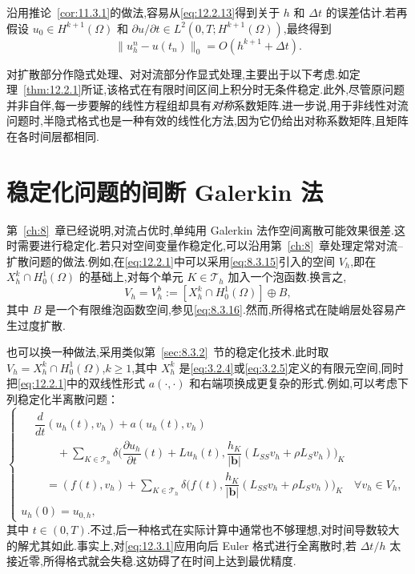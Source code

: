 沿用推论~\ref{cor:11.3.1}的做法,容易从\eqref{eq:12.2.13}得到关于 \(h\) 和 \(\Delta t\) 的误差估计.若再假设 \(u_0\in H^{k+1}(\Omega)\) 和 \(\partial u/\partial t\in L^2(0,T;H^{k+1}(\Omega))\),最终得到
\[
  \|u_h^n-u(t_n)\|_0=O(h^{k+1}+\Delta t).
\]

对扩散部分作隐式处理、对对流部分作显式处理,主要出于以下考虑.如定理~\ref{thm:12.2.1}所证,该格式在有限时间区间上积分时无条件稳定.此外,尽管原问题并非自伴,每一步要解的线性方程组却具有\emph{对称}系数矩阵.进一步说,用于非线性对流问题时,半隐式格式也是一种有效的线性化方法,因为它仍给出对称系数矩阵,且矩阵在各时间层都相同.

\section{稳定化问题的间断 Galerkin 法}\label{sec:12.3}

第~\ref{ch:8}~章已经说明,对流占优时,单纯用 Galerkin 法作空间离散可能效果很差.这时需要进行稳定化.若只对空间变量作稳定化,可以沿用第~\ref{ch:8}~章处理定常对流--扩散问题的做法.例如,在\eqref{eq:12.2.1}中可以采用\eqref{eq:8.3.15}引入的空间 \(V_h\),即在 \(X_h^k\cap H_0^1(\Omega)\) 的基础上,对每个单元 \(K\in\mathcal T_h\) 加入一个泡函数.换言之,
\[
  V_h=V_h^b:=[X_h^k\cap H_0^1(\Omega)]\oplus B,
\]
其中 \(B\) 是一个有限维泡函数空间,参见\eqref{eq:8.3.16}.然而,所得格式在陡峭层处容易产生过度扩散.

也可以换一种做法,采用类似第~\ref{sec:8.3.2}~节的稳定化技术.此时取 \(V_h=X_h^k\cap H_0^1(\Omega)\),\(k\ge1\),其中 \(X_h^k\) 是\eqref{eq:3.2.4}或\eqref{eq:3.2.5}定义的有限元空间,同时把\eqref{eq:12.2.1}中的双线性形式 \(a(\cdot,\cdot)\) 和右端项换成更复杂的形式.例如,可以考虑下列稳定化半离散问题：
\begin{equation}\label{eq:12.3.1}
  \begin{cases}
    \begin{aligned}
      &\dfrac{d}{dt}(u_h(t),v_h)+a(u_h(t),v_h)\\
      &\qquad+\displaystyle\sum_{K\in\mathcal T_h}\delta\biggl(
          \dfrac{\partial u_h}{\partial t}(t)+Lu_h(t),
          \dfrac{h_K}{|\boldsymbol{b}|}(L_{SS}v_h+\rho L_Sv_h)\biggr)_K\\
      &\quad=(f(t),v_h)
        +\displaystyle\sum_{K\in\mathcal T_h}\delta\biggl(
          f(t),\dfrac{h_K}{|\boldsymbol{b}|}(L_{SS}v_h+\rho L_Sv_h)\biggr)_K
          \quad\forall v_h\in V_h,
    \end{aligned}\\[2pt]
    u_h(0)=u_{0,h},
  \end{cases}
\end{equation}
其中 \(t\in(0,T)\).不过,后一种格式在实际计算中通常也不够理想,对时间导数较大的解尤其如此.事实上,对\eqref{eq:12.3.1}应用向后 Euler 格式进行全离散时,若 \(\Delta t/h\) 太接近零,所得格式就会失稳.这妨碍了在时间上达到最优精度.


